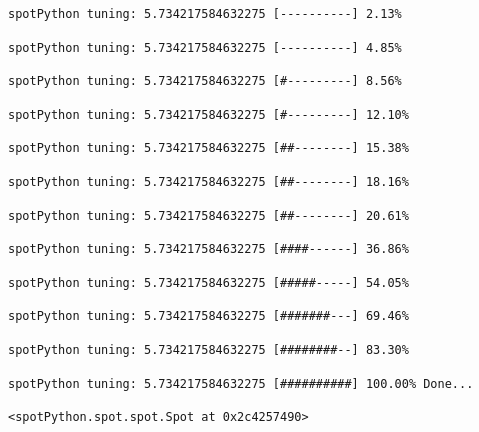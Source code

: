 \documentclass[
  letterpaper,
  DIV=11,
  numbers=noendperiod]{scrreprt}
\begin{document}
\begin{verbatim}
spotPython tuning: 5.734217584632275 [----------] 2.13% 
\end{verbatim}

\begin{verbatim}
spotPython tuning: 5.734217584632275 [----------] 4.85% 
\end{verbatim}

\begin{verbatim}
spotPython tuning: 5.734217584632275 [#---------] 8.56% 
\end{verbatim}

\begin{verbatim}
spotPython tuning: 5.734217584632275 [#---------] 12.10% 
\end{verbatim}

\begin{verbatim}
spotPython tuning: 5.734217584632275 [##--------] 15.38% 
\end{verbatim}

\begin{verbatim}
spotPython tuning: 5.734217584632275 [##--------] 18.16% 
\end{verbatim}

\begin{verbatim}
spotPython tuning: 5.734217584632275 [##--------] 20.61% 
\end{verbatim}

\begin{verbatim}
spotPython tuning: 5.734217584632275 [####------] 36.86% 
\end{verbatim}

\begin{verbatim}
spotPython tuning: 5.734217584632275 [#####-----] 54.05% 
\end{verbatim}

\begin{verbatim}
spotPython tuning: 5.734217584632275 [#######---] 69.46% 
\end{verbatim}

\begin{verbatim}
spotPython tuning: 5.734217584632275 [########--] 83.30% 
\end{verbatim}

\begin{verbatim}
spotPython tuning: 5.734217584632275 [##########] 100.00% Done...
\end{verbatim}

\begin{verbatim}
<spotPython.spot.spot.Spot at 0x2c4257490>
\end{verbatim}
\end{document}
